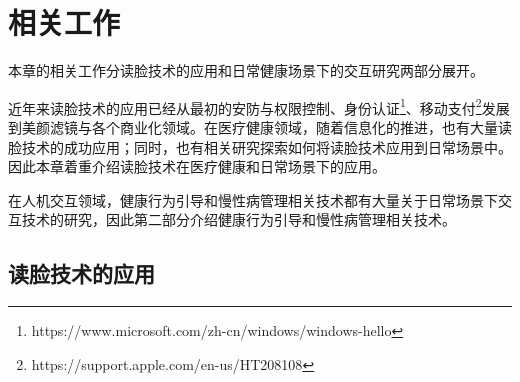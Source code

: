 \chapter{相关工作}

本章的相关工作分读脸技术的应用和日常健康场景下的交互研究两部分展开。

近年来读脸技术的应用已经从最初的安防与权限控制\cite{patel2014development}\cite{Owayjan2013Face}、身份认证\footnote{https://www.microsoft.com/zh-cn/windows/windows-hello}、移动支付\footnote{https://support.apple.com/en-us/HT208108}发展到美颜滤镜\cite{Sephora}与各个商业化领域。在医疗健康领域，随着信息化的推进，也有大量读脸技术的成功应用；同时，也有相关研究探索如何将读脸技术应用到日常场景中。因此本章着重介绍读脸技术在医疗健康和日常场景下的应用。

在人机交互领域，健康行为引导和慢性病管理相关技术都有大量关于日常场景下交互技术的研究，因此第二部分介绍健康行为引导和慢性病管理相关技术。

\section{读脸技术的应用}





